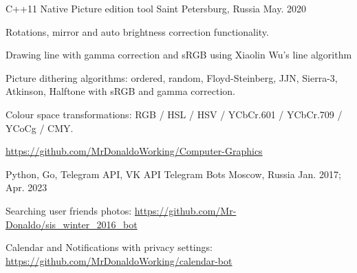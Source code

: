 

\begin{cventries}

  \cventry
    {C++11 Native}%
    {Picture edition tool} %
    {Saint Petersburg, Russia} %
    {May. 2020} %
    {
      \begin{cvitems} %
        \item {Rotations, mirror and auto brightness correction functionality.}
        \item {Drawing line with gamma correction and sRGB using Xiaolin Wu's line algorithm}
        \item {Picture dithering algorithms: ordered, random, Floyd-Steinberg, JJN, Sierra-3, Atkinson, Halftone with sRGB and gamma correction.}
        \item {Colour space transformations: RGB / HSL / HSV / YCbCr.601 / YCbCr.709 / YCoCg / CMY.}
        \item {\url{https://github.com/MrDonaldoWorking/Computer-Graphics}}
      \end{cvitems}
    }

  \cventry
    {Python, Go, Telegram API, VK API} %
    {Telegram Bots} %
    {Moscow, Russia} %
    {Jan. 2017; Apr. 2023} %
    {
      \begin{cvitems} %
        \item {Searching user friends photos: \url{https://github.com/Mr-Donaldo/sis_winter_2016_bot}}
        \item {Calendar and Notifications with privacy settings: \url{https://github.com/MrDonaldoWorking/calendar-bot}}
      \end{cvitems}
    }



\end{cventries}
